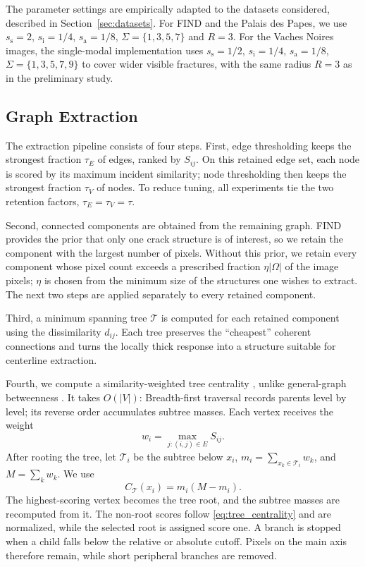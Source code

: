 \documentclass[conference,a4paper]{IEEEtran}
\begin{document}
The parameter settings are empirically adapted to the datasets considered, described in Section~\ref{sec:datasets}. For FIND and the Palais des Papes, we use $s_{\mathrm{s}}=2$, $s_{\mathrm{i}}=1/4$, $s_{\mathrm{a}}=1/8$, $\Sigma=\{1,3,5,7\}$ and $R=3$. For the Vaches Noires images, the single-modal implementation uses $s_{\mathrm{s}}=1/2$, $s_{\mathrm{i}}=1/4$, $s_{\mathrm{a}}=1/8$, $\Sigma=\{1,3,5,7,9\}$ to cover wider visible fractures, with the same radius $R=3$ as in the preliminary study.

\subsection{Graph Extraction}
The extraction pipeline consists of four steps. First, edge thresholding keeps the strongest fraction $\tau_E$ of edges, ranked by $S_{ij}$. On this retained edge set, each node is scored by its maximum incident similarity; node thresholding then keeps the strongest fraction $\tau_V$ of nodes. To reduce tuning, all experiments tie the two retention factors, $\tau_E=\tau_V=\tau$.

Second, connected components are obtained from the remaining graph. FIND provides the prior that only one crack structure is of interest, so we retain the component with the largest number of pixels. Without this prior, we retain every component whose pixel count exceeds a prescribed fraction $\eta|\Omega|$ of the image pixels; $\eta$ is chosen from the minimum size of the structures one wishes to extract. The next two steps are applied separately to every retained component.


Third, a minimum spanning tree $\mathcal T$ \cite{Prim1957} is computed for each retained component using the dissimilarity $d_{ij}$. Each tree preserves the ``cheapest'' coherent connections and turns the locally thick response into a structure suitable for centerline extraction.

Fourth, we compute a similarity-weighted tree centrality \cite{Freeman1977}, unlike general-graph betweenness \cite{Brandes2001}. It takes $O(|V|)$: Breadth-first traversal records parents level by level; its reverse order accumulates subtree masses. Each vertex receives the weight
\begin{equation}
    w_i=\max_{j:(i,j)\in E}S_{ij}.
\end{equation}
After rooting the tree, let $\mathcal T_i$ be the subtree below $x_i$, $m_i=\sum_{x_k\in\mathcal T_i}w_k$, and $M=\sum_k w_k$. We use
\begin{equation}
    C_{\mathcal T}(x_i)=m_i(M-m_i).
\label{eq:tree_centrality}
\end{equation}
The highest-scoring vertex becomes the tree root, and the subtree masses are recomputed from it. The non-root scores follow \eqref{eq:tree_centrality} and are normalized, while the selected root is assigned score one. A branch is stopped when a child falls below the relative or absolute cutoff. Pixels on the main axis therefore remain, while short peripheral branches are removed.
\end{document}
